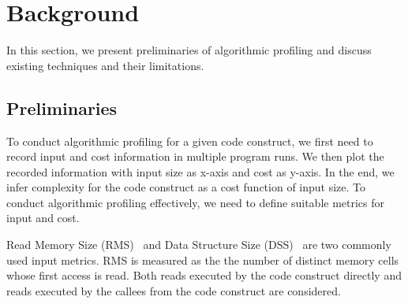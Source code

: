 
\section{Background}
\label{sec:back}

In this section, we present preliminaries of 
algorithmic profiling and discuss existing techniques and their
limitations. 


\subsection{Preliminaries}
\label{subsec:pre}

To conduct algorithmic profiling for a given code construct,
we first need to record input and cost information in multiple program runs. 
We then plot the recorded information with input size as x-axis and cost as y-axis.
In the end, we infer complexity for the code construct as a cost function of input size. 
To conduct algorithmic profiling effectively, 
we need to define suitable metrics for input and cost. 

%

Read Memory Size (RMS)~\citep{Aprof1,Aprof2}  and Data Structure Size (DSS)~\citep{AlgoProf} 
are two commonly used input metrics. 
RMS is measured as the the number of distinct memory cells 
whose first access is read. Both reads executed by the code 
construct directly and  reads executed by the callees from 
the code construct are considered. 


